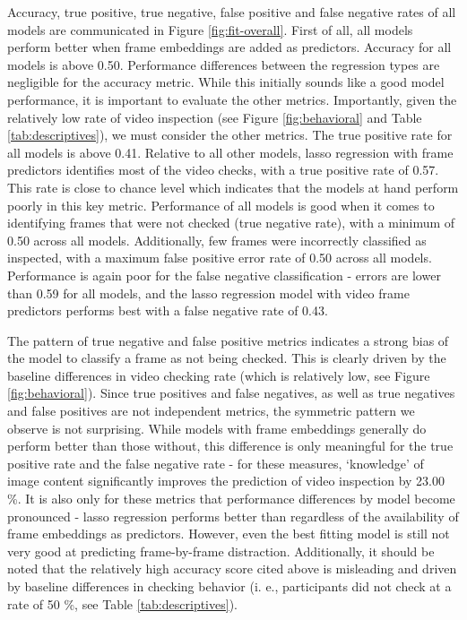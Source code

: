 \documentclass[
  man]{apa6}
\begin{document}
Accuracy, true positive, true negative, false positive and false negative rates of all models are communicated in Figure \ref{fig:fit-overall}. First of all, all models perform better when frame embeddings are added as predictors. Accuracy for all models is above 0.50. Performance differences between the regression types are negligible for the accuracy metric. While this initially sounds like a good model performance, it is important to evaluate the other metrics. Importantly, given the relatively low rate of video inspection (see Figure \ref{fig:behavioral} and Table \ref{tab:descriptives}), we must consider the other metrics. The true positive rate for all models is above 0.41. Relative to all other models, lasso regression with frame predictors identifies most of the video checks, with a true positive rate of 0.57. This rate is close to chance level which indicates that the models at hand perform poorly in this key metric. Performance of all models is good when it comes to identifying frames that were not checked (true negative rate), with a minimum of 0.50 across all models. Additionally, few frames were incorrectly classified as inspected, with a maximum false positive error rate of 0.50 across all models. Performance is again poor for the false negative classification - errors are lower than 0.59 for all models, and the lasso regression model with video frame predictors performs best with a false negative rate of 0.43.

The pattern of true negative and false positive metrics indicates a strong bias of the model to classify a frame as not being checked. This is clearly driven by the baseline differences in video checking rate (which is relatively low, see Figure \ref{fig:behavioral}). Since true positives and false negatives, as well as true negatives and false positives are not independent metrics, the symmetric pattern we observe is not surprising. While models with frame embeddings generally do perform better than those without, this difference is only meaningful for the true positive rate and the false negative rate - for these measures, `knowledge' of image content significantly improves the prediction of video inspection by 23.00 \%. It is also only for these metrics that performance differences by model become pronounced - lasso regression performs better than regardless of the availability of frame embeddings as predictors. However, even the best fitting model is still not very good at predicting frame-by-frame distraction.
Additionally, it should be noted that the relatively high accuracy score cited above is misleading and driven by baseline differences in checking behavior (i. e., participants did not check at a rate of 50 \%, see Table \ref{tab:descriptives}).
\end{document}
